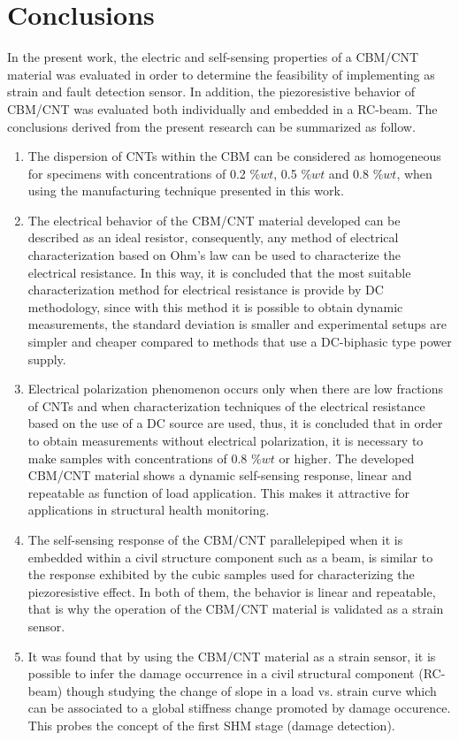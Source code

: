 \documentclass[twocolumn]{bmcart}%
\begin{document}
\section*{Conclusions}

In the present work, the electric and self-sensing properties of a CBM/CNT material was evaluated in order to determine the feasibility of implementing as strain and fault detection sensor. In addition, the piezoresistive behavior of CBM/CNT was evaluated both individually and embedded in a RC-beam. The conclusions derived from the present research can be summarized as follow.

\begin{enumerate}
    

\item  The dispersion of CNTs within the CBM can be considered as homogeneous for specimens with concentrations of 0.2 $\%wt$, 0.5 $\%wt$ and 0.8 $\%wt$, when using the manufacturing technique presented in this work.
\item  The electrical behavior of the CBM/CNT material developed can be described as an ideal resistor, consequently, any method of electrical characterization based on Ohm's law can be used to characterize the electrical resistance. In this way, it is concluded that the most suitable characterization method for electrical resistance is provide by DC methodology, since with this method it is possible to obtain dynamic measurements, the standard deviation is smaller and experimental setups are simpler and cheaper compared to methods that use a DC-biphasic type power supply.
\item  Electrical polarization phenomenon occurs only when there are low fractions of CNTs and when characterization techniques of the electrical resistance based on the use of a DC source are used, thus, it is concluded that in order to obtain measurements without electrical polarization, it is necessary to make samples with concentrations of 0.8 $\%wt$ or higher.
The developed CBM/CNT material shows a dynamic self-sensing response, linear and repeatable as function of load application. This makes it attractive for applications in structural health monitoring.
\item  The self-sensing response of the CBM/CNT parallelepiped when it is embedded within a civil structure component such as a beam, is similar to the response exhibited by the cubic samples used for characterizing the piezoresistive effect.  In both of them, the behavior is linear and repeatable, that is why the operation of the CBM/CNT material is validated as a strain sensor.
\item  It was found that by using the CBM/CNT material as a strain sensor, it is possible to infer the damage occurrence in a civil structural component (RC-beam) though studying the change of slope in a load vs. strain curve which can be associated to a global stiffness change promoted by damage occurence. This probes the concept of the first SHM stage (damage detection).
\end{enumerate}
\end{document}
